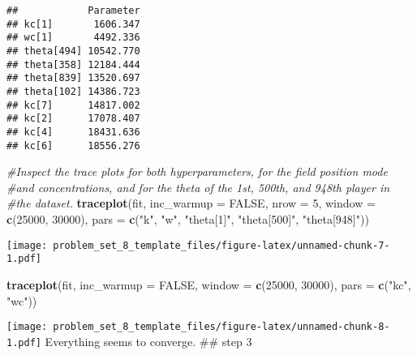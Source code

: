 \documentclass[
]{article}
\newenvironment{Shaded}{\begin{snugshade}}{\end{snugshade}}
\newcommand{\AttributeTok}[1]{\textcolor[rgb]{0.13,0.29,0.53}{#1}}
\newcommand{\CommentTok}[1]{\textcolor[rgb]{0.56,0.35,0.01}{\textit{#1}}}
\newcommand{\ConstantTok}[1]{\textcolor[rgb]{0.56,0.35,0.01}{#1}}
\newcommand{\DecValTok}[1]{\textcolor[rgb]{0.00,0.00,0.81}{#1}}
\newcommand{\FunctionTok}[1]{\textcolor[rgb]{0.13,0.29,0.53}{\textbf{#1}}}
\newcommand{\NormalTok}[1]{#1}
\newcommand{\OtherTok}[1]{\textcolor[rgb]{0.56,0.35,0.01}{#1}}
\newcommand{\SpecialCharTok}[1]{\textcolor[rgb]{0.81,0.36,0.00}{\textbf{#1}}}
\newcommand{\StringTok}[1]{\textcolor[rgb]{0.31,0.60,0.02}{#1}}
\begin{document}
\begin{verbatim}
##            Parameter
## kc[1]       1606.347
## wc[1]       4492.336
## theta[494] 10542.770
## theta[358] 12184.444
## theta[839] 13520.697
## theta[102] 14386.723
## kc[7]      14817.002
## kc[2]      17078.407
## kc[4]      18431.636
## kc[6]      18556.276
\end{verbatim}

\begin{Shaded}
\begin{Highlighting}[]
\CommentTok{\#Inspect the trace plots for both hyperparameters, for the field position mode }
\CommentTok{\#and concentrations, and for the theta of the 1st, 500th, and 948th player in }
\CommentTok{\#the dataset.}
\FunctionTok{traceplot}\NormalTok{(fit, }\AttributeTok{inc\_warmup =} \ConstantTok{FALSE}\NormalTok{, }\AttributeTok{nrow =} \DecValTok{5}\NormalTok{, }\AttributeTok{window =} \FunctionTok{c}\NormalTok{(}\DecValTok{25000}\NormalTok{, }\DecValTok{30000}\NormalTok{), }
          \AttributeTok{pars =} \FunctionTok{c}\NormalTok{(}\StringTok{"k"}\NormalTok{, }\StringTok{"w"}\NormalTok{, }\StringTok{"theta[1]"}\NormalTok{, }\StringTok{"theta[500]"}\NormalTok{, }\StringTok{"theta[948]"}\NormalTok{))}
\end{Highlighting}
\end{Shaded}

\texttt{[image: problem\_set\_8\_template\_files/figure-latex/unnamed-chunk-7-1.pdf]}

\begin{Shaded}
\begin{Highlighting}[]
\FunctionTok{traceplot}\NormalTok{(fit, }\AttributeTok{inc\_warmup =} \ConstantTok{FALSE}\NormalTok{, }\AttributeTok{window =} \FunctionTok{c}\NormalTok{(}\DecValTok{25000}\NormalTok{, }\DecValTok{30000}\NormalTok{), }
          \AttributeTok{pars =} \FunctionTok{c}\NormalTok{(}\StringTok{"kc"}\NormalTok{, }\StringTok{"wc"}\NormalTok{))}
\end{Highlighting}
\end{Shaded}

\texttt{[image: problem\_set\_8\_template\_files/figure-latex/unnamed-chunk-8-1.pdf]}
Everything seems to converge. \#\# step 3

\begin{Shaded}
\end{Shaded}
\end{document}
